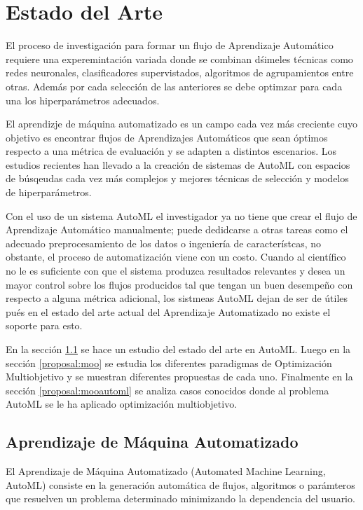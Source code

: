 \chapter{Estado del Arte}\label{chapter:state-of-the-art}
El proceso de investigaci\'on para formar un flujo de Aprendizaje Autom\'atico requiere una experemintaci\'on variada donde se combinan d\'simeles t\'ecnicas como redes neuronales, clasificadores supervistados, algoritmos de agrupamientos entre otras. Adem\'as por cada selecci\'on de las anteriores se debe optimzar para cada una los hiperpar\'ametros adecuados.

El aprendizje de m\'aquina automatizado es un campo cada vez m\'as creciente cuyo objetivo es encontrar flujos de Aprendizajes Autom\'aticos que sean \'optimos respecto a una m\'etrica de evaluaci\'on y se adapten a distintos escenarios. Los estudios recientes han llevado a la creaci\'on de sistemas de AutoML  con espacios de b\'usqeudas cada vez m\'as complejos y mejores t\'ecnicas de selecci\'on y modelos de hiperpar\'ametros.

Con el uso de un sistema AutoML el investigador ya no tiene que crear el flujo de Aprendizaje Autom\'atico manualmente; puede dedidcarse a otras tareas como el adecuado preprocesamiento de los datos o ingenier\'ia de caracter\'istcas, no obstante, el proceso de automatizaci\'on viene con un costo. Cuando al cient\'ifico no le es suficiente con que el sistema produzca resultados relevantes y desea un mayor control sobre los flujos producidos tal que tengan un buen desempe\~no con respecto a alguna m\'etrica adicional, los sistmeas AutoML dejan de ser de \'utiles pu\'es en el estado del arte actual del Aprendizaje Automatizado no existe el soporte para esto.

En la secci\'on \ref{proposal:automl} se  hace un estudio del estado del arte en AutoML. Luego en la secci\'on \ref{proposal:moo} se estudia los diferentes paradigmas de Optimizaci\'on Multiobjetivo y se muestran diferentes propuestas de cada uno. Finalmente en la secci\'on \ref{proposal:mooautoml} se analiza casos conocidos donde al problema AutoML se le ha aplicado optimizaci\'on multiobjetivo.

\section{Aprendizaje de M\'aquina Automatizado}\label{proposal:automl}
El Aprendizaje de M\'aquina Automatizado (Automated Machine Learning, AutoML) consiste en la generaci\'on autom\'atica de flujos, algoritmos o par\'amteros que resuelven un problema determinado minimizando la dependencia del usuario. 

